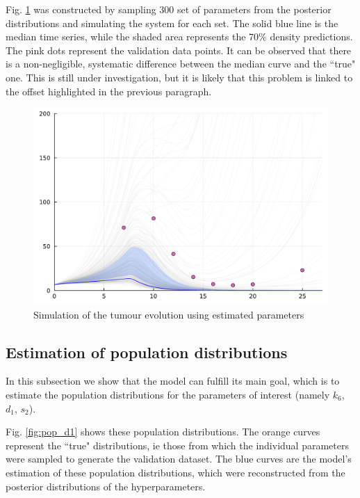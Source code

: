 \documentclass[11pt]{article}
\begin{document}
    Fig. \ref{fig:simul} was constructed by sampling 300 set of parameters from the posterior distributions and simulating the system for each set. The solid blue line is the median time series, while the shaded area represents the 70\% density predictions. The pink dots represent the validation data points. It can be observed that there is a non-negligible, systematic difference between the median curve and the ``true" one. This is still under investigation, but it is likely that this problem is linked to the offset highlighted in the previous paragraph. 

    \begin{figure}[!h]
        \centering
        \includegraphics[scale=0.4]{simul.pdf}
        \caption{Simulation of the tumour evolution using estimated parameters}
        \label{fig:simul}
    \end{figure}
    
    
        \subsection{Estimation of population distributions}
    In this subsection we show that the model can fulfill its main goal, which is to estimate the population distributions for the parameters of interest (namely $k_6$, $d_1$, $s_2$). 

    Fig. \ref{fig:pop_d1} shows these population distributions. The orange curves represent the ``true" distributions, ie those from which the individual parameters were sampled to generate the validation dataset. The blue curves are the model's estimation of these population distributions, which were reconstructed from the posterior distributions of the hyperparameters. 
    
\end{document}
